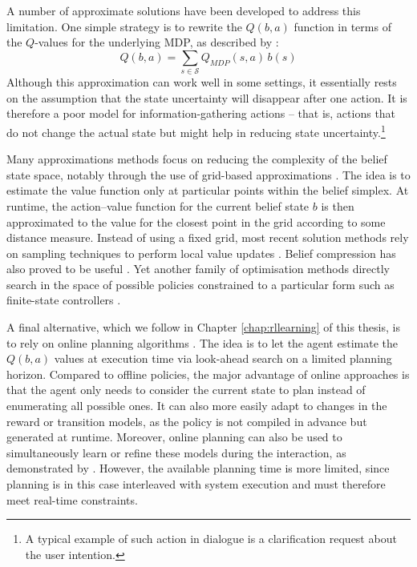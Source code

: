 A number of approximate solutions have been developed to address this limitation.  One simple strategy is to rewrite the $Q(b,a)$ function in terms of the $Q$-values for the underlying MDP, as described by \cite{Littman:1997}:
\begin{equation}
Q(b,a) = \sum_{s \in \mathcal{S}} Q_{\mathit{MDP}} (s,a)\, b(s)
\end{equation}
Although this approximation can work well in some settings, it essentially rests on the assumption that the state uncertainty will disappear after one action.  It is therefore a poor model for information-gathering actions -- that is, actions that do not change the actual state but might help in reducing state uncertainty.\footnote{A typical example of such action in dialogue is a clarification request about the user intention.} 

Many approximations methods focus on reducing the complexity of the belief state space, notably through the use of grid-based approximations \citep{Zhou:2001}.  The idea is to estimate the value function only at particular points within the belief simplex. At runtime, the action--value function for the current belief state $b$ is then approximated to the value for the closest point in the grid according to some distance measure. Instead of using a fixed grid, most recent solution methods rely on sampling techniques to perform local value updates \citep{Pineau_2003,KurHsu08,shani2013}. Belief compression has also proved to be useful \citep{Roy:2005}.  Yet another family of optimisation methods directly search in the space of possible policies constrained to a particular form such as finite-state controllers \citep{Hansen98}. 

A final alternative, which we follow in Chapter \ref{chap:rllearning} of this thesis, is to rely on online planning algorithms \citep{ross2008,NIPS2010_0740}.  The idea is to let the agent estimate the $Q(b,a)$ values at execution time via look-ahead search on a limited planning horizon. Compared to offline policies, the major advantage of online approaches is that the agent only needs to consider the current state to plan instead of enumerating all possible ones. It can also more easily adapt to changes in the reward or transition models, as the policy is not compiled in advance but generated at runtime. Moreover, online planning can also be used to simultaneously learn or refine these models during the interaction, as demonstrated by \cite{Ross:2011}.  However, the available planning time is more limited, since planning is in this case interleaved with system execution and must therefore meet real-time constraints. %

